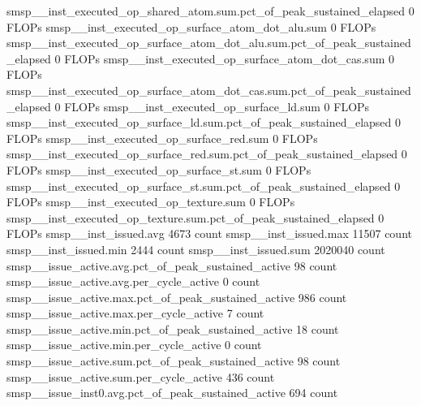 smsp__inst_executed_op_shared_atom.sum.pct_of_peak_sustained_elapsed                           0 FLOPs
smsp__inst_executed_op_surface_atom_dot_alu.sum                                                0 FLOPs
smsp__inst_executed_op_surface_atom_dot_alu.sum.pct_of_peak_sustained_elapsed                  0 FLOPs
smsp__inst_executed_op_surface_atom_dot_cas.sum                                                0 FLOPs
smsp__inst_executed_op_surface_atom_dot_cas.sum.pct_of_peak_sustained_elapsed                  0 FLOPs
smsp__inst_executed_op_surface_ld.sum                                                          0 FLOPs
smsp__inst_executed_op_surface_ld.sum.pct_of_peak_sustained_elapsed                            0 FLOPs
smsp__inst_executed_op_surface_red.sum                                                         0 FLOPs
smsp__inst_executed_op_surface_red.sum.pct_of_peak_sustained_elapsed                           0 FLOPs
smsp__inst_executed_op_surface_st.sum                                                          0 FLOPs
smsp__inst_executed_op_surface_st.sum.pct_of_peak_sustained_elapsed                            0 FLOPs
smsp__inst_executed_op_texture.sum                                                             0 FLOPs
smsp__inst_executed_op_texture.sum.pct_of_peak_sustained_elapsed                               0 FLOPs
smsp__inst_issued.avg                                                                       4673 count
smsp__inst_issued.max                                                                      11507 count
smsp__inst_issued.min                                                                       2444 count
smsp__inst_issued.sum                                                                    2020040 count
smsp__issue_active.avg.pct_of_peak_sustained_active                                           98 count
smsp__issue_active.avg.per_cycle_active                                                        0 count
smsp__issue_active.max.pct_of_peak_sustained_active                                          986 count
smsp__issue_active.max.per_cycle_active                                                        7 count
smsp__issue_active.min.pct_of_peak_sustained_active                                           18 count
smsp__issue_active.min.per_cycle_active                                                        0 count
smsp__issue_active.sum.pct_of_peak_sustained_active                                           98 count
smsp__issue_active.sum.per_cycle_active                                                      436 count
smsp__issue_inst0.avg.pct_of_peak_sustained_active                                           694 count
